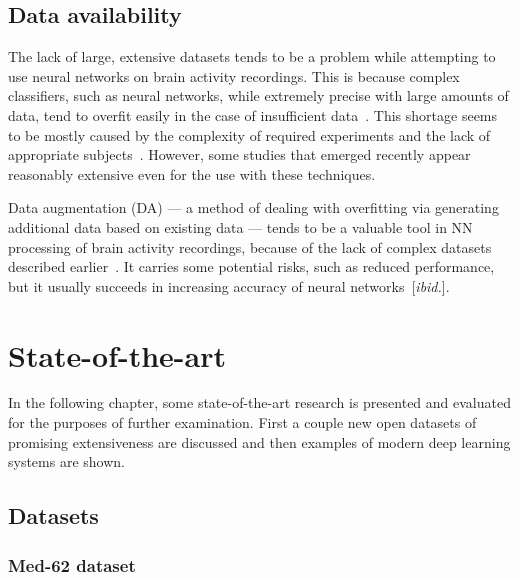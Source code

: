 \documentclass[eng,BP]{thesiskiv}
\begin{document}
\section{Data availability}

The lack of large, extensive datasets tends to be a problem while attempting to use neural networks on brain activity recordings. This is because complex classifiers, such as neural networks, while extremely precise with large amounts of data, tend to overfit easily in the case of insufficient data~\cite{domingos:ml:12}. This shortage seems to be mostly caused by the complexity of required experiments and the lack of appropriate subjects~\cite{he:da:21}. However, some studies that emerged recently appear reasonably extensive even for the use with these techniques.

Data augmentation (DA) --- a method of dealing with overfitting via generating additional data based on existing data --- tends to be a valuable tool in NN processing of brain activity recordings, because of the lack of complex datasets described earlier~\cite{he:da:21}. It carries some potential risks, such as reduced performance, but it usually succeeds in increasing accuracy of neural networks~[\emph{ibid.}].


\chapter{State-of-the-art}


In the following chapter, some state-of-the-art research is presented and evaluated for the purposes of further examination. First a couple new open datasets of promising extensiveness are discussed and then examples of modern deep learning systems are shown.

\section{Datasets}


\subsection{Med-62 dataset}
\end{document}
